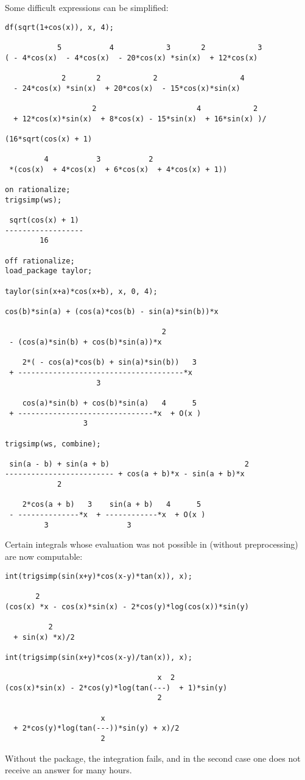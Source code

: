 Some difficult expressions can be simplified:
\begin{verbatim}
df(sqrt(1+cos(x)), x, 4);

            5           4            3       2            3
( - 4*cos(x)  - 4*cos(x)  - 20*cos(x) *sin(x)  + 12*cos(x)

             2       2            2                   4
  - 24*cos(x) *sin(x)  + 20*cos(x)  - 15*cos(x)*sin(x)

                    2                       4            2
  + 12*cos(x)*sin(x)  + 8*cos(x) - 15*sin(x)  + 16*sin(x) )/

(16*sqrt(cos(x) + 1)

         4           3           2
 *(cos(x)  + 4*cos(x)  + 6*cos(x)  + 4*cos(x) + 1))

on rationalize;
trigsimp(ws);

 sqrt(cos(x) + 1)
------------------
        16

off rationalize;
load_package taylor;

taylor(sin(x+a)*cos(x+b), x, 0, 4);

cos(b)*sin(a) + (cos(a)*cos(b) - sin(a)*sin(b))*x

                                    2
 - (cos(a)*sin(b) + cos(b)*sin(a))*x

    2*( - cos(a)*cos(b) + sin(a)*sin(b))   3
 + --------------------------------------*x
                     3

    cos(a)*sin(b) + cos(b)*sin(a)   4      5
 + -------------------------------*x  + O(x )
                  3

trigsimp(ws, combine);

 sin(a - b) + sin(a + b)                               2
------------------------- + cos(a + b)*x - sin(a + b)*x
            2

    2*cos(a + b)   3    sin(a + b)   4      5
 - --------------*x  + ------------*x  + O(x )
         3                  3
\end{verbatim}

Certain integrals whose evaluation was not possible in \REDUCE{}
(without preprocessing) are now computable:
\begin{verbatim}
int(trigsimp(sin(x+y)*cos(x-y)*tan(x)), x);

       2
(cos(x) *x - cos(x)*sin(x) - 2*cos(y)*log(cos(x))*sin(y)

          2
  + sin(x) *x)/2

int(trigsimp(sin(x+y)*cos(x-y)/tan(x)), x);

                                   x  2
(cos(x)*sin(x) - 2*cos(y)*log(tan(---)  + 1)*sin(y)
                                   2

                      x
  + 2*cos(y)*log(tan(---))*sin(y) + x)/2
                      2
\end{verbatim}
Without the package, the integration fails, and in the second case one
does not receive an answer for many hours.

